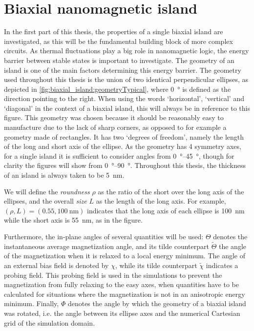 \documentclass[11pt,a4paper,english]{article}
\begin{document}
\section{Biaxial nanomagnetic island}
\label{par:Biaxial_island}
In the first part of this thesis, the properties of a single biaxial island are investigated, as this will be the fundamental building block of more complex circuits. As thermal fluctuations play a big role in nanomagnetic logic, the energy barrier between stable states is important to investigate. The geometry of an island is one of the main factors determining this energy barrier. The geometry used throughout this thesis is the union of two identical perpendicular ellipses, as depicted in \cref{fig:biaxial_island:geometryTypical}, where \SI{0}{\degree} is defined as the direction pointing to the right. When using the words `horizontal', `vertical' and `diagonal' in the context of a biaxial island, this will always be in reference to this figure. This geometry was chosen because it should be reasonably easy to manufacture due to the lack of sharp corners, as opposed to for example a geometry made of rectangles. It has two `degrees of freedom', namely the length of the long and short axis of the ellipse. As the geometry has 4 symmetry axes, for a single island it is sufficient to consider angles from \SIrange{0}{45}{\degree}, though for clarity the figures will show from \SIrange{0}{90}{\degree}. Throughout this thesis, the thickness of an island is always taken to be \SI{5}{\nano\metre}. \par
We will define the \textit{roundness} $\rho$ as the ratio of the short over the long axis of the ellipses, and the overall \textit{size} $L$ as the length of the long axis. For example, $(\rho, L)=(0.55, \SI{100}{\nano\metre})$ indicates that the long axis of each ellipse is \SI{100}{\nano\metre} while the short axis is \SI{55}{\nano\metre}, as in the figure. \par
Furthermore, the in-plane angles of several quantities will be used: $\Theta$ denotes the instantaneous average magnetization angle, and its tilde counterpart $\widetilde{\Theta}$ the angle of the magnetization when it is relaxed to a local energy minimum. The angle of an external bias field is denoted by $\chi$, while its tilde counterpart $\widetilde{\chi}$ indicates a probing field. This probing field is used in the simulations to prevent the magnetization from fully relaxing to the easy axes, when quantities have to be calculated for situations where the magnetization is not in an anisotropic energy minimum. Finally, $\Phi$ denotes the angle by which the geometry of a biaxial island was rotated, i.e. the angle between its ellipse axes and the numerical Cartesian grid of the simulation domain.
\end{document}
